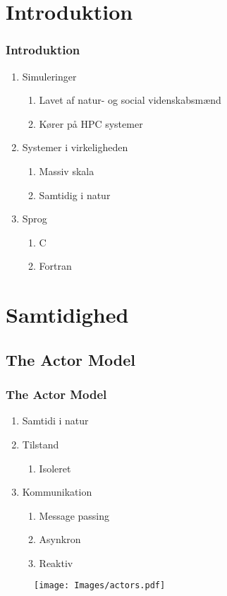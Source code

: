 \section{Introduktion}
\begin{frame}
  \frametitle{Introduktion}
  \begin{enumerate}
    \item Simuleringer
    \begin{enumerate}
      \item Lavet af natur- og social videnskabsmænd
      \item Kører på HPC systemer
    \end{enumerate}
    \item Systemer i virkeligheden
    \begin{enumerate}
      \item Massiv skala
      \item Samtidig i natur
    \end{enumerate}
    \item Sprog
    \begin{enumerate}
      \item C
      \item Fortran
    \end{enumerate}
  \end{enumerate}
\end{frame}

\section{Samtidighed}
\subsection{The Actor Model}
\begin{frame}
  \frametitle{The Actor Model}
  \begin{enumerate}
    \item Samtidi i natur
    \item Tilstand
    \begin{enumerate}
      \item Isoleret
    \end{enumerate}
    \item Kommunikation
    \begin{enumerate}
      \item Message passing
      \item Asynkron
      \item Reaktiv
    \end{enumerate}
  \end{enumerate}
  \begin{figure}[htbp]
  \centering
  \texttt{[image: Images/actors.pdf]}
\end{figure}
\end{frame}

